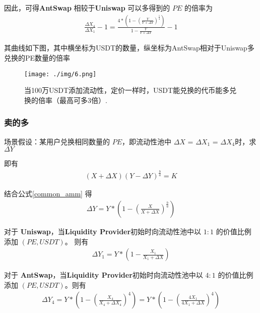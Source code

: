 \documentclass{article}
\begin{document}
因此，可得\textbf{AntSwap} 相较于\textbf{Uniswap} 可以多得到的 $PE$ 的倍率为 
\begin{equation*}
\begin{split}
\frac{\Delta X_4}{\Delta X_1} - 1 = \frac{4 * (1- (\frac{Y}{Y + \Delta Y})^\frac{1}{4})}{1-\frac{Y}{Y + \Delta Y}} - 1
\end{split}
\end{equation*}

其曲线如下图，其中横坐标为USDT的数量，纵坐标为AntSwap相对于Uniswap多兑换的PE数量的倍率

\begin{figure}[H]
\centering
\texttt{[image: ./img/6.png]}
\caption{\label{fig}当100万USDT添加流动性，定价一样时，USDT能兑换的代币能多兑换的倍率（最高可多3倍）.}
\end{figure}

\subsubsection{卖的多}

场景假设：某用户兑换相同数量的 $PE$，即流动性池中 $\Delta X$ = $\Delta X_1$ = $\Delta X_4$时，求 $\Delta Y$

即有
\begin{equation*}
\begin{split}
(X + \Delta X)(Y - \Delta Y)^\frac{b}{a} = K
\end{split}
\end{equation*}

结合公式\ref{common_amm} 得
\begin{equation*}
\begin{split}
\Delta Y = Y * (1 - (\frac{X}{X+\Delta X})^\frac{b}{a})
\end{split}
\end{equation*}

对于 \textbf{Uniswap}，当\textbf{Liquidity Provider}初始时向流动性池中以 $1:1$ 的价值比例添加 $(PE, USDT)$。 则有
\begin{equation*}
\begin{split}
\Delta Y_1 = Y * (1 - \frac{X_1}{X_1+\Delta X})
\end{split}
\end{equation*}

对于 \textbf{AntSwap}，当\textbf{Liquidity Provider}初始时向流动性池中以 $4:1$ 的价值比例添加 $(PE, USDT)$。则有
\begin{equation*}
\begin{split}
\Delta Y_4 = Y * (1 - (\frac{X_4}{X_4+\Delta X_4})^4) = Y * (1 - (\frac{4X_1}{4X_1+\Delta X})^4)
\end{split}
\end{equation*}
\end{document}
